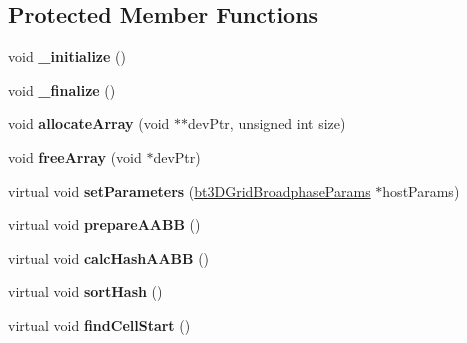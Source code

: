 \subsection*{Protected Member Functions}
\begin{DoxyCompactItemize}
\item 
\hypertarget{classbt_cuda_broadphase_a09ed0c839ef61f334c38dab20476c3b7}{void {\bfseries \+\_\+initialize} ()}\label{classbt_cuda_broadphase_a09ed0c839ef61f334c38dab20476c3b7}

\item 
\hypertarget{classbt_cuda_broadphase_a61394d3810a738528f656686b875c8e7}{void {\bfseries \+\_\+finalize} ()}\label{classbt_cuda_broadphase_a61394d3810a738528f656686b875c8e7}

\item 
\hypertarget{classbt_cuda_broadphase_a47db8e157fc1029ccdb12550379ad55b}{void {\bfseries allocate\+Array} (void $\ast$$\ast$dev\+Ptr, unsigned int size)}\label{classbt_cuda_broadphase_a47db8e157fc1029ccdb12550379ad55b}

\item 
\hypertarget{classbt_cuda_broadphase_af85d34a3fa5d1d623198515257d9e7f8}{void {\bfseries free\+Array} (void $\ast$dev\+Ptr)}\label{classbt_cuda_broadphase_af85d34a3fa5d1d623198515257d9e7f8}

\item 
\hypertarget{classbt_cuda_broadphase_a0eac938289ecea152b03d663cbbc7f52}{virtual void {\bfseries set\+Parameters} (\hyperlink{structbt3_d_grid_broadphase_params}{bt3\+D\+Grid\+Broadphase\+Params} $\ast$host\+Params)}\label{classbt_cuda_broadphase_a0eac938289ecea152b03d663cbbc7f52}

\item 
\hypertarget{classbt_cuda_broadphase_a0daa83631e6c1cb7aa0d94760d55a048}{virtual void {\bfseries prepare\+A\+A\+B\+B} ()}\label{classbt_cuda_broadphase_a0daa83631e6c1cb7aa0d94760d55a048}

\item 
\hypertarget{classbt_cuda_broadphase_ae76d447f3e584cd65338d26d57b32688}{virtual void {\bfseries calc\+Hash\+A\+A\+B\+B} ()}\label{classbt_cuda_broadphase_ae76d447f3e584cd65338d26d57b32688}

\item 
\hypertarget{classbt_cuda_broadphase_a03eaf23fb81e2f8b2eb3bb067f59b65b}{virtual void {\bfseries sort\+Hash} ()}\label{classbt_cuda_broadphase_a03eaf23fb81e2f8b2eb3bb067f59b65b}

\item 
\hypertarget{classbt_cuda_broadphase_a5e140d328fabcab963d4b16a53cb93ad}{virtual void {\bfseries find\+Cell\+Start} ()}\label{classbt_cuda_broadphase_a5e140d328fabcab963d4b16a53cb93ad}


\end{DoxyCompactItemize}

